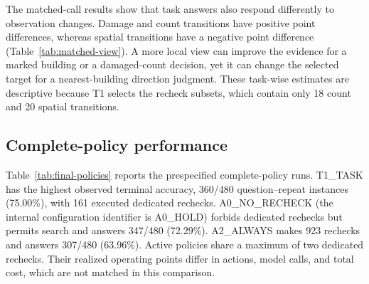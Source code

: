 \begin{table}[!t]
\centering\small
\caption{ChangeOS localization and binary-damage audit on the same 43 development ROIs and 7,238 annotated buildings at each height. Loc. P/R are localization precision/recall; FP is an unmatched prediction, FN an unmatched GT building, and FP/ROI is FP/43. All-GT accuracy counts unmatched GT as wrong but does not count unmatched predictions; matched accuracy and macro-F1 condition on matched GT only.}
\label{tab:detection-fp-audit}
\end{table}

The matched-call results show that task answers also respond differently to observation changes. Damage and count transitions have positive point differences, whereas spatial transitions have a negative point difference (Table~\ref{tab:matched-view}). A more local view can improve the evidence for a marked building or a damaged-count decision, yet it can change the selected target for a nearest-building direction judgment. These task-wise estimates are descriptive because T1 selects the recheck subsets, which contain only 18 count and 20 spatial transitions.

\subsection{Complete-policy performance}
Table~\ref{tab:final-policies} reports the prespecified complete-policy runs. T1\_TASK has the highest observed terminal accuracy, 360/480 question--repeat instances (75.00\%), with 161 executed dedicated rechecks. A0\_NO\_RECHECK (the internal configuration identifier is A0\_HOLD) forbids dedicated rechecks but permits search and answers 347/480 (72.29\%). A2\_ALWAYS makes 923 rechecks and answers 307/480 (63.96\%). Active policies share a maximum of two dedicated rechecks. Their realized operating points differ in actions, model calls, and total cost, which are not matched in this comparison.

